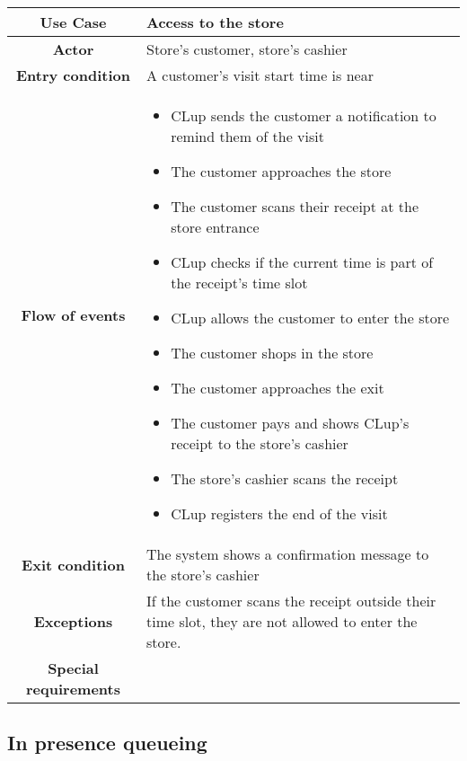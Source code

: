 \documentclass[../../main.tex]{subfiles}
\begin{document}
    \begin{table}[H]
      \centering
        \begin{tabular}{c m{}}
        \hline
        \textbf{Use Case} & Access to the store\\ \hline
        \textbf{Actor} & Store's customer, store's cashier\\ \hline
        \textbf{Entry condition} & A customer's visit start time is near\\  \hline
        \textbf{Flow of events} & \begin{itemize}
                                    \item CLup sends the customer a notification to remind them of the visit
                                    \item The customer approaches the store
                                    \item The customer scans their receipt at the store entrance
                                    \item CLup checks if the current time is part of the receipt's time slot
                                    \item CLup allows the customer to enter the store
                                    \item The customer shops in the store
                                    \item The customer approaches the exit
                                    \item The customer pays and shows CLup's receipt to the store's cashier
                                    \item The store's cashier scans the receipt
                                    \item CLup registers the end of the visit
                                  \end{itemize}\\ \hline
        \textbf{Exit condition} & The system shows a confirmation message to the store's cashier \\ \hline
        \textbf{Exceptions} & If the customer scans the receipt outside their time slot, they are not allowed to enter the store. \\ \hline
        \textbf{Special requirements} &\\ \hline
        \end{tabular}
    \end{table}

    \subsection*{In presence queueing}
\end{document}

